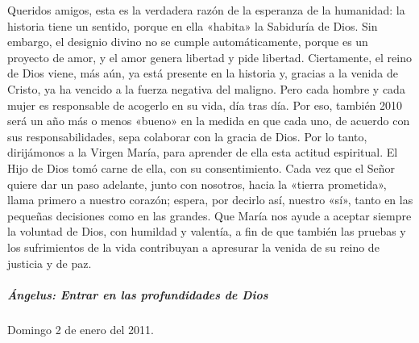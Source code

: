 \documentclass[]{article}
\let\oldsubparagraph\subparagraph
\renewcommand{\subparagraph}[1]{\oldsubparagraph{#1}\mbox{}}
\begin{document}
Queridos amigos, esta es la verdadera razón de la esperanza de la
humanidad: la historia tiene un sentido, porque en ella «habita» la
Sabiduría de Dios. Sin embargo, el designio divino no se cumple
automáticamente, porque es un proyecto de amor, y el amor genera
libertad y pide libertad. Ciertamente, el reino de Dios viene, más aún,
ya está presente en la historia y, gracias a la venida de Cristo, ya ha
vencido a la fuerza negativa del maligno. Pero cada hombre y cada mujer
es responsable de acogerlo en su vida, día tras día. Por eso, también
2010 será un año más o menos «bueno» en la medida en que cada uno, de
acuerdo con sus responsabilidades, sepa colaborar con la gracia de Dios.
Por lo tanto, dirijámonos a la Virgen María, para aprender de ella esta
actitud espiritual. El Hijo de Dios tomó carne de ella, con su
consentimiento. Cada vez que el Señor quiere dar un paso adelante, junto
con nosotros, hacia la «tierra prometida», llama primero a nuestro
corazón; espera, por decirlo así, nuestro «sí», tanto en las pequeñas
decisiones como en las grandes. Que María nos ayude a aceptar siempre la
voluntad de Dios, con humildad y valentía, a fin de que también las
pruebas y los sufrimientos de la vida contribuyan a apresurar la venida
de su reino de justicia y de paz.

\subparagraph{Ángelus: Entrar en las profundidades de
Dios}\label{uxe1ngelus-entrar-en-las-profundidades-de-dios}

Domingo 2 de enero del 2011.
\end{document}

